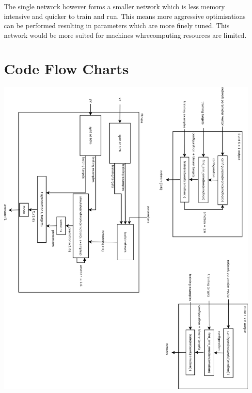 \documentclass[11pt]{article}
\begin{document}
The single network however forms a smaller network which is less memory intensive and quicker to train and run. This means more aggressive optimisations can be performed resulting in parameters which are more finely tuned. This network would be more suited for machines whrecomputing resources are limited.

\section{Code Flow Charts}

\includegraphics[width=\linewidth]{build_networks.png}
\end{document}
